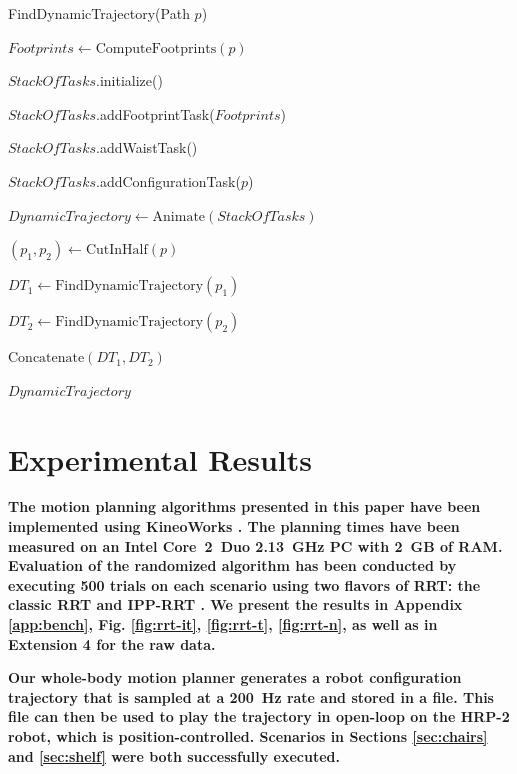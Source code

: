 \documentclass{article}
\begin{document}
\begin{algorithm}[h]
\caption{FindDynamicTrajectory(Path $p$)}
\label{alg:walk}
\begin{algorithmic}
\STATE $Footprints \leftarrow \text{ComputeFootprints}(p)$

\STATE $StackOfTasks$.initialize()

\STATE $StackOfTasks$.addFootprintTask($Footprints$)

\STATE $StackOfTasks$.addWaistTask()

\STATE $StackOfTasks$.addConfigurationTask($p$)

\STATE $DynamicTrajectory \leftarrow \text{Animate}(StackOfTasks)$


\STATE $(p_1,p_2) \leftarrow \text{CutInHalf}(p)$

\STATE $DT_1 \leftarrow \text{FindDynamicTrajectory}(p_1)$

\STATE $DT_2 \leftarrow \text{FindDynamicTrajectory}(p_2)$

\RETURN $\text{Concatenate}(DT_1,DT_2)$

\ELSE

\RETURN $DynamicTrajectory$

\ENDIF
\end{algorithmic}
\end{algorithm}





\section{Experimental Results}

\label{sec:exp}

\textbf{The motion planning algorithms presented in this paper have
  been implemented using KineoWorks\texttrademark
  \cite{laumond2006kcs}. The planning times have been measured on an
  Intel Core~2~Duo 2.13~GHz PC with 2~GB of RAM. Evaluation of the
  randomized algorithm has been conducted by executing 500 trials on
  each scenario using two flavors of RRT: the classic RRT and IPP-RRT
  \cite{FERR04A}. We present the results in Appendix \ref{app:bench},
  Fig. \ref{fig:rrt-it}, \ref{fig:rrt-t}, \ref{fig:rrt-n}, as well as
  in Extension 4 for the raw data.}

\textbf{Our whole-body motion planner generates a robot configuration
  trajectory that is sampled at a 200~Hz rate and stored in a
  file. This file can then be used to play the trajectory in open-loop
  on the HRP-2 robot, which is position-controlled. Scenarios in
  Sections \ref{sec:chairs} and \ref{sec:shelf} were both successfully
  executed.}
\end{document}
